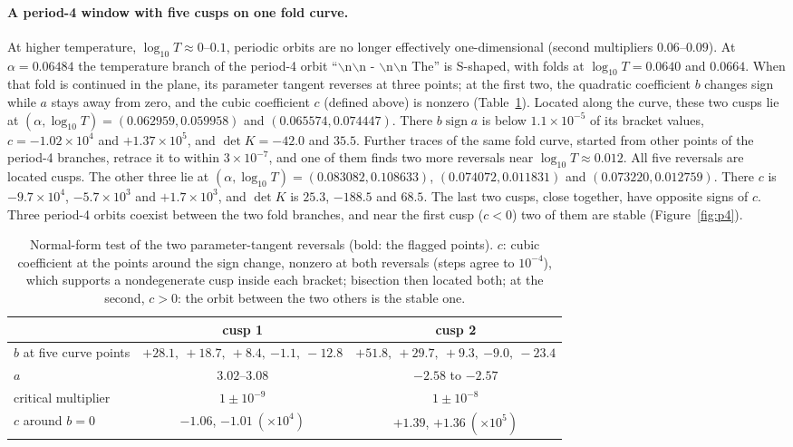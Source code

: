\documentclass[11pt,letterpaper]{article}
\begin{document}
\paragraph{A period-4 window with five cusps on one fold curve.} At higher temperature, $\log_{10}T\approx0$--$0.1$, periodic orbits
are no longer effectively one-dimensional (second multipliers $0.06$--$0.09$). At $\alpha=0.06484$ the temperature
branch of the period-4 orbit ``$\backslash$n$\backslash$n - $\backslash$n$\backslash$n The'' is S-shaped, with folds
at $\log_{10}T=0.0640$ and $0.0664$. When that fold is continued in the plane, its parameter tangent reverses at three
points; at the first two, the quadratic coefficient $b$ changes sign while $a$ stays away from zero,
and the cubic coefficient $c$ (defined above) is nonzero (Table~\ref{tab:cusps}). Located along the curve, these two cusps lie at
$(\alpha,\log_{10}T)=(0.062959,0.059958)$ and $(0.065574,0.074447)$. There $b\operatorname{sign}a$ is below
$1.1\times10^{-5}$ of its bracket values, $c=-1.02\times10^{4}$ and $+1.37\times10^{5}$, and $\det K=-42.0$ and $35.5$. Further traces of the same fold curve,
started from other points of the period-4 branches, retrace it to within $3\times10^{-7}$, and one of them finds two
more reversals near $\log_{10}T\approx0.012$. All five reversals are located cusps. The other three lie at
$(\alpha,\log_{10}T)=(0.083082,0.108633)$, $(0.074072,0.011831)$ and $(0.073220,0.012759)$. There $c$ is
$-9.7\times10^{4}$, $-5.7\times10^{3}$ and $+1.7\times10^{3}$, and $\det K$ is $25.3$, $-188.5$ and $68.5$. The last
two cusps, close together, have opposite signs of $c$. Three period-4 orbits
coexist between the two fold branches, and near the first cusp ($c<0$) two of them are stable
(Figure~\ref{fig:p4}).
\begin{table}[H]
\centering\small
\begin{tabular}{lcc}
\toprule
 & cusp 1 & cusp 2 \\
\midrule
$b$ at five curve points & $+28.1,\ +18.7,\ +8.4,\ \mathbf{-1.1},\ -12.8$ &
  $+51.8,\ +29.7,\ +9.3,\ \mathbf{-9.0},\ -23.4$ \\
$a$ & $3.02$--$3.08$ & $-2.58$ to $-2.57$ \\
critical multiplier & $1\pm10^{-9}$ & $1\pm10^{-8}$ \\
$c$ around $b=0$ & $-1.06$, $-1.01\ (\times10^{4})$ & $+1.39$, $+1.36\ (\times10^{5})$ \\
\bottomrule
\end{tabular}
\caption{Normal-form test of the two parameter-tangent reversals (bold: the flagged points). $c$: cubic
coefficient at the points around the sign change, nonzero at both reversals (steps agree to $10^{-4}$), which supports
a nondegenerate cusp inside each bracket; bisection then located both; at the second, $c>0$: the orbit between the two others is the stable one.}
\label{tab:cusps}
\end{table}
\end{document}
